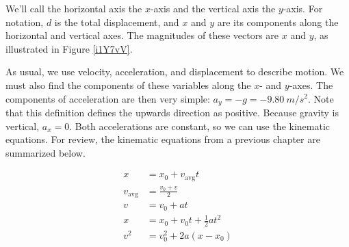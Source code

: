 \documentclass[dvipsnames]{article}
\numberwithin{equation}{section}
\numberwithin{figure}{section}
\begin{document}
\vspace{1em}

We'll call the horizontal axis the $x$-axis and the vertical axis the $y$-axis. For notation, $d$ is the total displacement, and $x$ and $y$ are its components along the horizontal and vertical axes. The magnitudes of these vectors are $x$ and $y$, as illustrated in Figure \ref{i1Y7vV}.

\begin{center}
    \captionsetup{type=figure,margin=1in,font=scriptsize}
    \label{i1Y7vV}
\end{center}

\vspace{1em}

As usual, we use velocity, acceleration, and displacement to describe motion. We must also find the components of these variables along the $x$- and $y$-axes. The components of acceleration are then very simple: $a_y = -g = -\SI{9.80}{m/s^2}$. Note that this definition defines the upwards direction as positive. Because gravity is vertical, $a_x = 0$. Both accelerations are constant, so we can use the kinematic equations. For review, the kinematic equations from a previous chapter are summarized below.

\begin{align}
    x &= x_0 + v_{\text{avg}} t\\[0.5ex]
    v_{\text{avg}} &= \frac{v_0 + v}{2}\\[0.5ex]
    v &= v_0 + a t\\[0.5ex]
    x &= x_0 + v_0 t + \frac{1}{2} a t^2\\[0.5ex]
    v^2 &= v_0^2 + 2 a (x - x_0)
\end{align}
\end{document}
